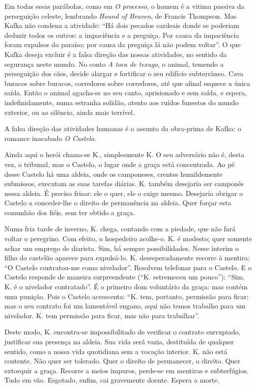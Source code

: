 Em todas essas parábolas,
como em \textit{O processo}, o homem é a vitima passiva da perseguição celeste,
lembrando \textit{Hound of Heaven}, de Francis Thompson. Mas Kafka não condena a
atividade: ``Há dois pecados cardeais donde se poderiam deduzir todos
os outros: a impaciência e a preguiça. Por causa da impaciência foram
expulsos do paraíso; por causa da preguiça lá não podem voltar''. O que Kafka deseja excluir é a falsa direção das nossas atividades, no sentido
da segurança neste mundo. No conto \textit{A toca de texugo}, o animal, temendo a perseguição dos
cães, decide alargar e fortificar o seu edifício subterrâneo. Cava
buracos sobre buracos, corredores sobre corredores, até que afinal esquece a única saída. Então o animal agacha-se no seu canto,
aprisionado e sem saída, e espera, indefinidamente, numa estranha solidão, atento aos ruídos funestos do mundo exterior, ou ao silêncio,
ainda mais terrível.

A falsa direção das atividades humanas é o assunto
da obra-prima de Kafka: o romance inacabado \textit{O Castelo}.

Ainda aqui o herói chama-se K., simplesmente K. O seu adversário não é, desta vez, o
tribunal, mas o Castelo, o lugar onde a graça está concentrada. Ao pé
desse Castelo há uma aldeia, onde os camponeses, crentes humildemente submissos, executam as suas tarefas diárias. K. também desejaria ser camponês nessa
aldeia. É preciso frisar: ele o quer, ele o exige mesmo. Desejaria obrigar o Castelo a conceder-lhe o direito de permanência na aldeia. Quer forçar esta comunhão dos fiéis, sem ter obtido a graça.

Numa fria tarde de inverno, K. chega, contando
com a piedade, que não fará voltar o peregrino. Com efeito, o hospedeiro
acolhe-o. K. é modesto; quer somente achar um emprego de diarista.
Sim, há sempre possibilidades. Nesse ínterim o filho do castelão aparece
para expulsá-lo. K. desesperadamente recorre à mentira: ``O Castelo contratou-me como nivelador''. Resolvem telefonar para o Castelo. E o
Castelo responde de maneira surpreendente (``K. estremeceu um pouco''): ``Sim, K. é o nivelador contratado''. É o primeiro dom voluntário da graça: mas
contém uma punição. Pois o Castelo acrescenta: ``K. tem, portanto,
permissão para ficar; mas o seu contrato foi um lamentável engano, aqui
não temos trabalho para um nivelador. K. tem permissão para ficar, mas
não para trabalhar''.

Deste modo, K. encontra-se impossibilitado de
verificar o contrato surrupiado, justificar sua presença na aldeia. Sua
vida será vazia, destituída de qualquer sentido, como a nossa vida
quotidiana sem a vocação interior. K. não está contente. Não quer ser
tolerado. Quer o direito de permanecer, o direito. Quer extorquir a
graça. Recorre a meios impuros, perde-se em mentiras e subterfúgios.
Tudo em vão. Esgotado, enfim, cai gravemente doente. Espera a morte.

